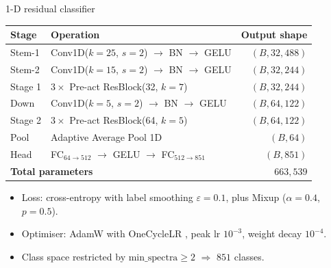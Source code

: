 \documentclass[10pt,aspectratio=169,xcolor=dvipsnames]{beamer}
\begin{document}
\begin{frame}{1-D residual classifier}
  \begin{table}\centering\footnotesize
  \begin{tabular}{@{}llr@{}}
    \toprule
    \textbf{Stage} & \textbf{Operation} & \textbf{Output shape}\\
    \midrule
    Stem-1   & Conv1D($k{=}25$, $s{=}2$) $\to$ BN $\to$ GELU & $(B, 32, 488)$\\
    Stem-2   & Conv1D($k{=}15$, $s{=}2$) $\to$ BN $\to$ GELU & $(B, 32, 244)$\\
    Stage 1  & $3 \times$ Pre-act ResBlock(32, $k{=}7$)      & $(B, 32, 244)$\\
    Down     & Conv1D($k{=}5$, $s{=}2$) $\to$ BN $\to$ GELU  & $(B, 64, 122)$\\
    Stage 2  & $3 \times$ Pre-act ResBlock(64, $k{=}5$)      & $(B, 64, 122)$\\
    Pool     & Adaptive Average Pool 1D                       & $(B, 64)$\\
    Head     & FC$_{64\to 512}$ $\to$ GELU $\to$ FC$_{512\to 851}$ & $(B, 851)$\\
    \midrule
    \multicolumn{2}{l}{\textbf{Total parameters}} & \textbf{$663{,}539$}\\
    \bottomrule
  \end{tabular}
  \end{table}
  \smallskip
  \begin{itemize}\setlength\itemsep{0.15em}
    \item Loss: cross-entropy with label smoothing $\varepsilon = 0.1$,
          plus Mixup ($\alpha = 0.4$, $p = 0.5$).
    \item Optimiser: AdamW \cite{loshchilov2019adamw} with OneCycleLR
          \cite{smith2019onecycle}, peak lr $10^{-3}$, weight decay $10^{-4}$.
    \item Class space restricted by $\text{min\_spectra} \geq 2$
          $\Rightarrow$ $851$ classes.
  \end{itemize}
\end{frame}
\end{document}
